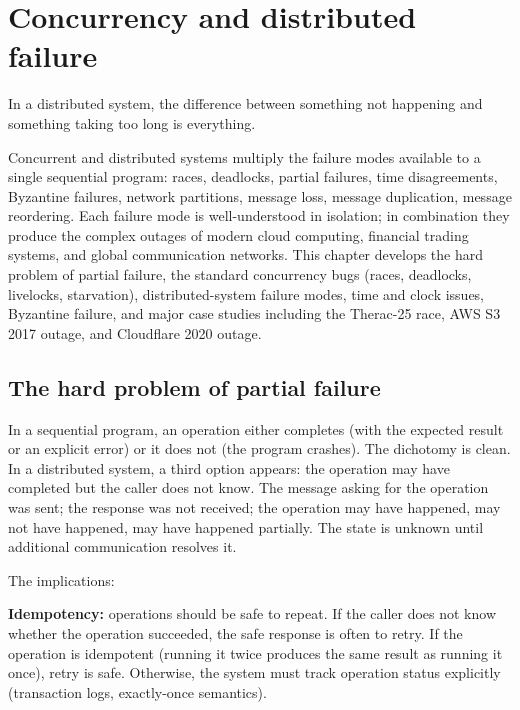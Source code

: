 \chapter{Concurrency and distributed failure}
\label{vol10:ch06}

\epigraph{In a distributed system, the difference between something not happening and something taking too long is everything.}{}


\noindent
Concurrent and distributed systems multiply the failure modes available to a single sequential program: races, deadlocks, partial failures, time disagreements, Byzantine failures, network partitions, message loss, message duplication, message reordering. Each failure mode is well-understood in isolation; in combination they produce the complex outages of modern cloud computing, financial trading systems, and global communication networks. This chapter develops the hard problem of partial failure, the standard concurrency bugs (races, deadlocks, livelocks, starvation), distributed-system failure modes, time and clock issues, Byzantine failure, and major case studies including the Therac-25 race, AWS S3 2017 outage, and Cloudflare 2020 outage.

\section{The hard problem of partial failure}

In a sequential program, an operation either completes (with the expected result or an explicit error) or it does not (the program crashes). The dichotomy is clean. In a distributed system, a third option appears: the operation may have completed but the caller does not know. The message asking for the operation was sent; the response was not received; the operation may have happened, may not have happened, may have happened partially. The state is unknown until additional communication resolves it.

The implications:

\textbf{Idempotency:} operations should be safe to repeat. If the caller does not know whether the operation succeeded, the safe response is often to retry. If the operation is idempotent (running it twice produces the same result as running it once), retry is safe. Otherwise, the system must track operation status explicitly (transaction logs, exactly-once semantics).

